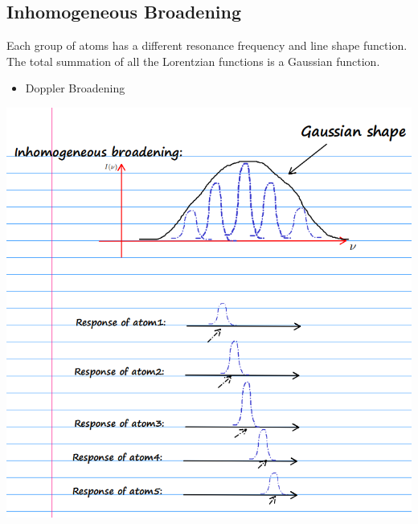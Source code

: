 \documentclass[11pt]{article}
\begin{document}
\subsection{Inhomogeneous Broadening}
Each group of atoms has a different resonance frequency and line shape function. The total summation of all the Lorentzian functions is a Gaussian function.
\begin{itemize}
    \item Doppler Broadening
\end{itemize}
\begin{center}
    \includegraphics[scale=0.6]{2.png}
\end{center}
\end{document}
